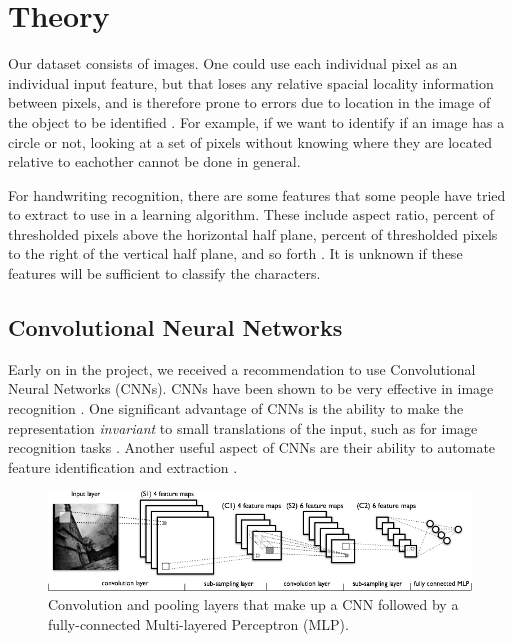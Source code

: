 \section{Theory}

Our dataset consists of images.  One could use each individual pixel as an individual input feature, but that loses any relative spacial locality information between pixels, and is therefore prone to errors due to location in the image of the object to be identified \cite{lecun1998gradient}.  For example, if we want to identify if an image has a circle or not, looking at a set of pixels without knowing where they are located relative to eachother cannot be done in general.

For handwriting recognition, there are some features that some people have tried to extract to use in a learning algorithm.  These include aspect ratio, percent of thresholded pixels above the horizontal half plane, percent of thresholded pixels to the right of the vertical half plane, and so forth \cite{wikihandwritfeat}.  It is unknown if these features will be sufficient to classify the characters.

\subsection{Convolutional Neural Networks}

Early on in the project, we received a recommendation to use Convolutional Neural Networks (CNNs).  CNNs have been shown to be very effective in image recognition \cite{korekado2003convolutional} \cite{ciresan2012multi}.  One significant advantage of CNNs is the ability to make the representation \emph{invariant} to small translations of the input, such as for image recognition tasks \cite{Bengio-et-al-2015-Book}.  Another useful aspect of CNNs are their ability to automate feature identification and extraction \cite{Bengio-et-al-2015-Book}.

\begin{figure}[h]
  \centering
  \includegraphics{images/mylenet.png}
  \caption{
    Convolution and pooling layers that make up a CNN followed by a
    fully-connected Multi-layered Perceptron (MLP).
    }
  \label{fig:convnet}
\end{figure}

